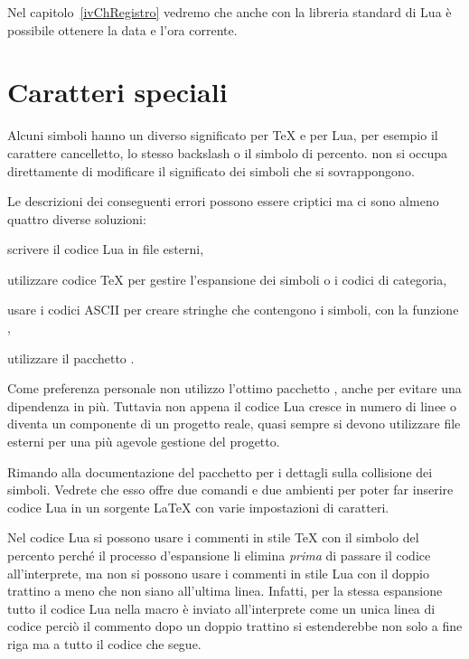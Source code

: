 Nel capitolo~\ref{ivChRegistro} vedremo che anche con la libreria standard di
Lua è possibile ottenere la data e l'ora corrente.


\section{Caratteri speciali}

Alcuni simboli hanno un diverso significato per \TeX{} e per Lua, per esempio il
carattere cancelletto, lo stesso backslash o il simbolo di percento. \LuaTeX{}
non si occupa direttamente di modificare il significato dei simboli che si
sovrappongono.

Le descrizioni dei conseguenti errori possono essere criptici ma ci sono almeno
quattro diverse soluzioni:
\begin{compactitemize}
\item scrivere il codice Lua in file esterni,
\item utilizzare codice \TeX{} per gestire l'espansione dei simboli o i codici
di categoria,
\item usare i codici ASCII per creare stringhe che contengono i simboli, con la
funzione ,
\item utilizzare il pacchetto .
\end{compactitemize}

Come preferenza personale non utilizzo l'ottimo pacchetto ,
anche per evitare una dipendenza in più. Tuttavia non appena il codice Lua
cresce in numero di linee o diventa un componente di un progetto reale, quasi
sempre si devono utilizzare file esterni per una più agevole gestione del
progetto.

Rimando alla documentazione del pacchetto  per i dettagli sulla
collisione dei simboli. Vedrete che esso offre due comandi e due ambienti per
poter far inserire codice Lua in un sorgente \LaTeX{} con varie impostazioni di
caratteri.

Nel codice Lua si possono usare i commenti in stile \TeX{} con il simbolo del
percento perché il processo d'espansione li elimina \emph{prima} di passare il
codice all'interprete, ma non si possono usare i commenti in stile Lua con il
doppio trattino a meno che non siano all'ultima linea. Infatti, per la stessa
espansione tutto il codice Lua nella macro  è inviato
all'interprete come un unica linea di codice perciò il commento dopo un doppio
trattino si estenderebbe non solo a fine riga ma a tutto il codice che segue.

